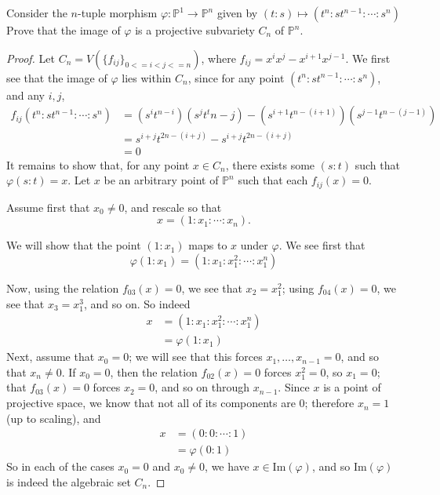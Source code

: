 \documentclass[12pt]{article}
\theoremstyle{definition}
\newenvironment{problem}[2][Problem]{\begin{trivlist}
\item[\hskip \labelsep {\bfseries #1}\hskip \labelsep {\bfseries #2.}]}{\end{trivlist}}
\begin{document}
\begin{problem}{4}
    Consider the $n$-tuple morphism $\varphi: \mathbb P^1 \to \mathbb P^n$ given by $(t:s) \mapsto (t^n : st^{n-1}: \cdots : s^n)$ Prove that the image of $\varphi$ is a projective subvariety $C_n$ of $\mathbb P^n$.
    \begin{proof}
        Let $C_n = V(\{f_{ij}\}_{0 <= i < j <= n})$, where $f_{ij} = x^ix^j - x^{i+1}x^{j-1}$. We first see that the image of $\varphi$ lies within $C_n$, since for any point $(t^n :st^{n-1}: \cdots : s^n)$, and any $i,j$,
        \begin{align*}
            f_{ij}(t^n:st^{n-1}:\cdots:s^n)&= (s^it^{n-i})(s^jt^tn-j) - (s^{i+1}t^{n - (i+1)})(s^{j-1}t^{n - (j - 1)})\\
            &= s^{i+j}t^{2n - (i + j)} - s^{i+j}t^{2n - (i + j)}\\
            &= 0
        \end{align*}
        It remains to show that, for any point $x \in C_n$, there exists some $(s:t)$ such that $\varphi(s:t) = x$. Let $x$ be an arbitrary point of $\mathbb P^n$ such that each $f_{ij}(x) = 0$. 
        \par Assume first that $x_0 \neq 0$, and rescale so that
        \[x = (1: x_1 : \cdots : x_n).\]
        \par We will show that the point $(1:x_1)$ maps to $x$ under $\varphi$. We see first that 
        \[\varphi(1:x_1) = (1: x_1 :x_1^2 : \cdots : x_1^n)\]
        \par Now, using the relation $f_{03}(x) = 0$, we see that $x_2 = x_1^2$; using $f_{04}(x)=0$, we see that $x_3 = x_1^3$, and so on. So indeed 
        \begin{align*}
            x &= (1:x_1:x_1^2:\cdots :x_1^n)\\
            &= \varphi(1:x_1)
        \end{align*}
        Next, assume that $x_0 = 0$; we will see that this forces $x_1, \dots , x_{n-1} = 0$, and so that $x_n \neq 0$. If $x_0 = 0$, then the relation $f_{02}(x)=0$ forces $x_1^2 = 0$, so $x_1=0$; that $f_{03}(x)=0$ forces $x_2= 0$, and so on through $x_{n-1}$. Since $x$ is a point of projective space, we know that not all of its components are $0$; therefore $x_n = 1$ (up to scaling), and
        \begin{align*}
            x &= (0:0 : \cdots : 1)\\
            &= \varphi(0:1)
        \end{align*}
        So in each of the cases $x_0 = 0$ and $x_0 \neq 0$, we have $x \in \text{Im}(\varphi)$, and so $\text{Im}(\varphi)$ is indeed the algebraic set $C_n$.
    \end{proof}
\end{problem}
\end{document}
